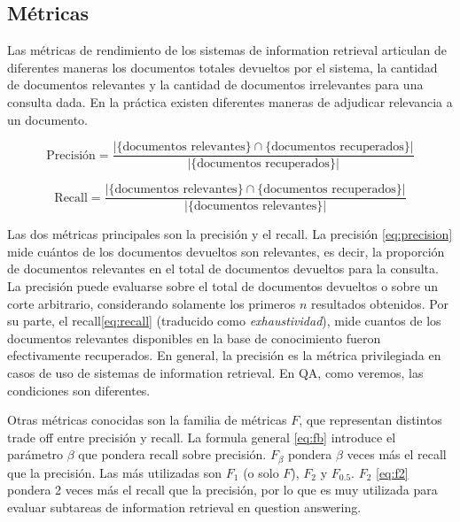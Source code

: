 \subsection{Métricas}
\label{subsec:metricas-ir}
Las métricas de rendimiento de los sistemas de information retrieval articulan de diferentes maneras los documentos totales devueltos por el sistema, la cantidad de documentos relevantes y la cantidad de documentos irrelevantes para una consulta dada. En la práctica existen diferentes maneras de adjudicar relevancia a un documento.

\begin{equation}\label{eq:precision}
 \mbox{Precisión}=\frac{|\{\mbox{documentos relevantes}\}\cap\{\mbox{documentos recuperados}\}|}{|\{\mbox{documentos recuperados}\}|}
\end{equation}

\begin{equation}\label{eq:recall}
  \mbox{Recall}=\frac{|\{\mbox{documentos relevantes}\}\cap\{\mbox{documentos recuperados}\}|}{|\{\mbox{documentos relevantes}\}|}
\end{equation}

\medskip

Las dos métricas principales son la precisión y el recall.
La precisión \eqref{eq:precision} mide cuántos de los documentos devueltos son relevantes, es decir, la proporción de documentos relevantes en el total de documentos devueltos para la consulta. La precisión puede evaluarse sobre el total de documentos devueltos o sobre un corte arbitrario, considerando solamente los primeros $n$  resultados obtenidos. Por su parte, el recall\eqref{eq:recall} (traducido como \textit{exhaustividad}), mide cuantos de los documentos relevantes disponibles en la base de conocimiento fueron efectivamente recuperados. En general, la precisión es la métrica privilegiada en casos de uso de sistemas de information retrieval. En QA, como veremos, las condiciones son diferentes.



Otras métricas conocidas son la familia de métricas $F$, que representan distintos trade off entre precisión y recall.
La formula general \eqref{eq:fb} introduce el parámetro $\beta$ que pondera recall sobre precisión. $F_\beta$ pondera $\beta$ veces más el recall que la precisión. Las más utilizadas son $F_1$ (o solo $F$), $F_2$ y $F_{0.5}$. $F_2$ \eqref{eq:f2} pondera 2 veces más el recall que la precisión, por lo que es muy utilizada para evaluar subtareas de information retrieval en question answering.

